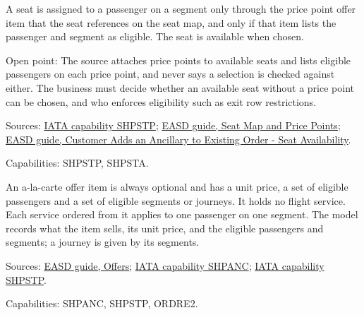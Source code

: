 \begin{theorem}
  \label{thm:ancillaries-seat-eligible-price-point}
  \notready
  A seat is assigned to a passenger on a segment only through the price
  point offer item that the seat references on the seat map, and only if
  that item lists the passenger and segment as eligible. The seat is
  available when chosen.

  Open point: The source attaches price points to available seats and lists
  eligible passengers on each price point, and never says a selection is
  checked against either. The business must decide whether an available seat
  without a price point can be chosen, and who enforces eligibility such as
  exit row restrictions.

  Sources: \href{https://retailing.iata.org/armi/docs/SHPSTP/}{IATA capability SHPSTP};
  \href{https://standards.atlassian.net/wiki/spaces/EASD/pages/574455867}{EASD guide, Seat Map and Price Points};
  \href{https://standards.atlassian.net/wiki/spaces/EASD/pages/842268814}{EASD guide, Customer Adds an Ancillary to Existing Order - Seat Availability}.

  Capabilities: SHPSTP, SHPSTA.
\end{theorem}

\begin{definition}
  \label{def:ancillaries-alacarte-item}
  An a-la-carte offer item is always optional and has a unit price, a set of
  eligible passengers and a set of eligible segments or journeys. It holds
  no flight service. Each service ordered from it applies to one passenger
  on one segment.
  The model records what the item sells, its unit price, and the eligible
  passengers and segments; a journey is given by its segments.

  Sources: \href{https://standards.atlassian.net/wiki/spaces/EASD/pages/600637464}{EASD guide, Offers};
  \href{https://retailing.iata.org/armi/docs/SHPANC/}{IATA capability SHPANC};
  \href{https://retailing.iata.org/armi/docs/SHPSTP/}{IATA capability SHPSTP}.

  Capabilities: SHPANC, SHPSTP, ORDRE2.
\end{definition}

